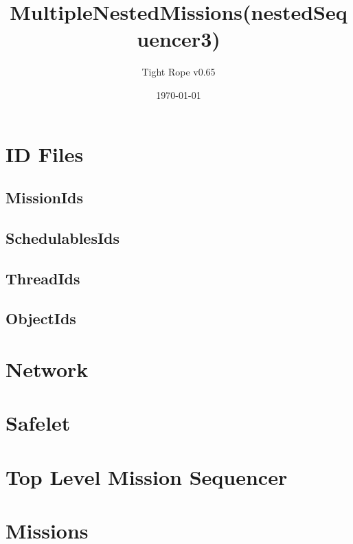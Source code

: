 \documentclass[10pt,a4paper]{article}
\title{MultipleNestedMissions(nestedSequencer3)}
\author{Tight Rope v0.65}
\date{\today}
\begin{document}
\maketitle

\section{ID Files}
\subsection{MissionIds}

\newpage

\subsection{SchedulablesIds}

\newpage

\subsection{ThreadIds}

\newpage

\subsection{ObjectIds}

\newpage

\section{Network}

\newpage


\section{Safelet}

\newpage
{}
\newpage

\section{Top Level Mission Sequencer}

\newpage
{}
\newpage

\section{Missions}
\end{document}
